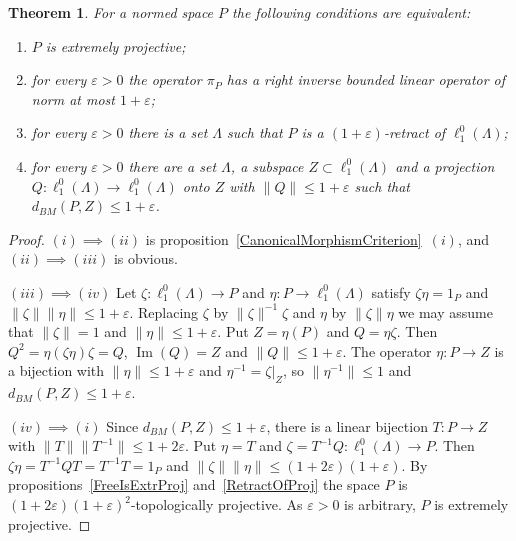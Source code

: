 \documentclass[12pt]{article}
\newtheorem{theorem}{Theorem}[section]
\newcommand{\lo}[1]{\ell_1^0(#1)}
\newcommand{\norm}[1]{\lVert #1\rVert}
\renewcommand{\Im}{\operatorname{Im}}
\newcommand{\BM}{d_{BM}}
\begin{document}
\begin{theorem}\label{ExtrProjCriterion} For a normed space $P$ the following
    conditions are equivalent:
    \begin{enumerate}[label = (\roman*)]
        \item $P$ is extremely projective;
        \item for every $\varepsilon>0$ the operator $\pi_P$ has a right
              inverse bounded linear operator of norm at most $1+\varepsilon$;
        \item for every $\varepsilon>0$ there is a set $\Lambda$ such that $P$
              is a $(1+\varepsilon)$-retract of $\lo{\Lambda}$;
        \item for every $\varepsilon>0$ there are a set $\Lambda$, a subspace
              $Z\subset\lo{\Lambda}$ and a projection $Q:\lo{\Lambda}\to\lo{\Lambda}$
              onto $Z$ with $\norm{Q}\leq 1+\varepsilon$ such that
              $\BM(P,Z)\leq 1+\varepsilon$.
    \end{enumerate}
\end{theorem}
\begin{proof} $(i)\implies(ii)$ is proposition~\ref{CanonicalMorphismCriterion}~$(i)$,
    and $(ii)\implies(iii)$ is obvious.

    $(iii)\implies(iv)$ Let $\zeta:\lo{\Lambda}\to P$ and $\eta:P\to\lo{\Lambda}$
    satisfy $\zeta\eta=1_P$ and $\norm{\zeta}\norm{\eta}\leq 1+\varepsilon$. Replacing
    $\zeta$ by $\norm{\zeta}^{-1}\zeta$ and $\eta$ by $\norm{\zeta}\eta$ we may
    assume that $\norm{\zeta}=1$ and $\norm{\eta}\leq 1+\varepsilon$. Put
    $Z=\eta(P)$ and $Q=\eta\zeta$. Then $Q^2=\eta(\zeta\eta)\zeta=Q$,
    $\Im(Q)=Z$ and $\norm{Q}\leq 1+\varepsilon$. The operator $\eta:P\to Z$
    is a bijection with $\norm{\eta}\leq 1+\varepsilon$ and
    $\eta^{-1}=\zeta|_Z$, so $\norm{\eta^{-1}}\leq 1$ and
    $\BM(P,Z)\leq 1+\varepsilon$.

    $(iv)\implies(i)$ Since $\BM(P,Z)\leq 1+\varepsilon$, there is a linear
    bijection $T:P\to Z$ with $\norm{T}\norm{T^{-1}}\leq 1+2\varepsilon$. Put
    $\eta=T$ and $\zeta=T^{-1}Q:\lo{\Lambda}\to P$. Then
    $\zeta\eta=T^{-1}QT=T^{-1}T=1_P$ and
    $\norm{\zeta}\norm{\eta}\leq(1+2\varepsilon)(1+\varepsilon)$. By
    propositions~\ref{FreeIsExtrProj} and~\ref{RetractOfProj} the space $P$ is
    $(1+2\varepsilon)(1+\varepsilon)^2$-topologically projective. As
    $\varepsilon>0$ is arbitrary, $P$ is extremely projective.
\end{proof}
\end{document}
